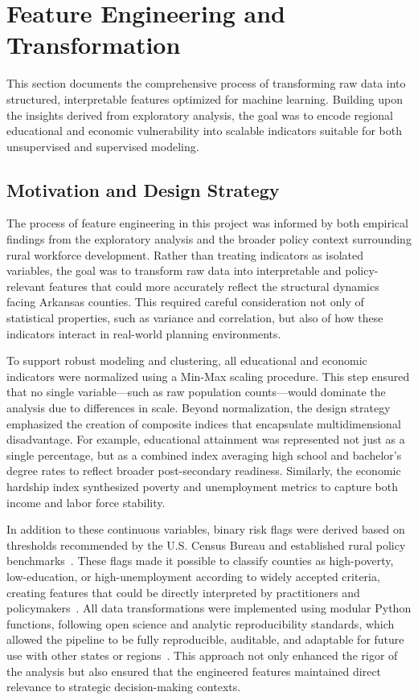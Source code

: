 \documentclass{llncs}
\begin{document}
\section{Feature Engineering and Transformation}\label{sec:feature_engineering}

This section documents the comprehensive process of transforming raw data into structured, interpretable features optimized for machine learning. Building upon the insights derived from exploratory analysis, the goal was to encode regional educational and economic vulnerability into scalable indicators suitable for both unsupervised and supervised modeling.

\subsection{Motivation and Design Strategy}

The process of feature engineering in this project was informed by both empirical findings from the exploratory analysis and the broader policy context surrounding rural workforce development. Rather than treating indicators as isolated variables, the goal was to transform raw data into interpretable and policy-relevant features that could more accurately reflect the structural dynamics facing Arkansas counties. This required careful consideration not only of statistical properties, such as variance and correlation, but also of how these indicators interact in real-world planning environments.

To support robust modeling and clustering, all educational and economic indicators were normalized using a Min-Max scaling procedure. This step ensured that no single variable—such as raw population counts—would dominate the analysis due to differences in scale. Beyond normalization, the design strategy emphasized the creation of composite indices that encapsulate multidimensional disadvantage. For example, educational attainment was represented not just as a single percentage, but as a combined index averaging high school and bachelor's degree rates to reflect broader post-secondary readiness. Similarly, the economic hardship index synthesized poverty and unemployment metrics to capture both income and labor force stability.

In addition to these continuous variables, binary risk flags were derived based on thresholds recommended by the U.S. Census Bureau and established rural policy benchmarks~\cite{uscensus_datacodes_2023,ruralpolicy_henderson_2020}. These flags made it possible to classify counties as high-poverty, low-education, or high-unemployment according to widely accepted criteria, creating features that could be directly interpreted by practitioners and policymakers~\cite{hhs_poverty_guidelines_2025,usda_ruraldefs_2022}. All data transformations were implemented using modular Python functions, following open science and analytic reproducibility standards, which allowed the pipeline to be fully reproducible, auditable, and adaptable for future use with other states or regions~\cite{stoudenmire_reproducible_2019}. This approach not only enhanced the rigor of the analysis but also ensured that the engineered features maintained direct relevance to strategic decision-making contexts.
\end{document}

